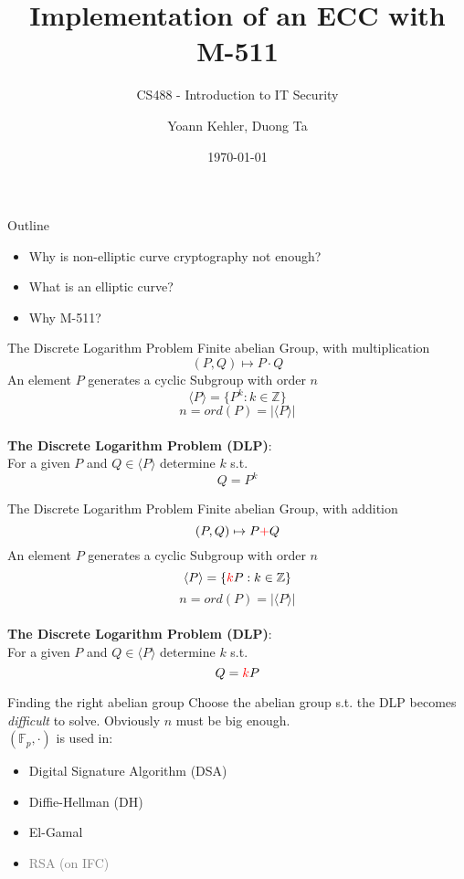 \documentclass{beamer}
\begin{document}
\title{Implementation of an ECC with M-511} 
\subtitle{CS488 - Introduction to IT Security}
\author{Yoann Kehler, Duong Ta}
\date{\today} 

\begin{frame}
\titlepage
\end{frame} 

\begin{frame}{Outline}
\begin{itemize}
	\item Why is non-elliptic curve cryptography not enough?
	\item What is an elliptic curve?
	\item Why M-511?
\end{itemize}
\end{frame} 
\begin{frame}{The Discrete Logarithm Problem\cite{werner2013elliptische}}
	Finite abelian Group, with multiplication\\
	\[(P,Q) \mapsto P \cdot Q\]
	\pause
	An element $P$ generates a cyclic Subgroup with order $n$\\
	\[\langle P \rangle = \{P^k : k \in \mathbb{Z} \} \]
	\[n = ord(P) = |\langle P \rangle| \]\\ \vspace{0.5cm}
	\pause
	\textbf{The Discrete Logarithm Problem (DLP)}: \\
	For a given $P$ and $Q \in \langle P \rangle$ determine $k$ s.t. \\
	\[Q=P^k\]
\end{frame}
\begin{frame}{The Discrete Logarithm Problem\cite{werner2013elliptische}}
Finite abelian Group, with \textcolor[rgb]{1.00,0.00,0.00}{addition}\\
\[(P,Q) \mapsto P \textcolor[rgb]{1.00,0.00,0.00}{+} Q\]
An element $P$ generates a cyclic Subgroup with order $n$\\
\[\langle P \rangle = \{\textcolor[rgb]{1.00,0.00,0.00}{k}P : k \in \mathbb{Z} \} \]
\[n = ord(P) = |\langle P \rangle| \]\\ \vspace{0.5cm}
\textbf{The Discrete Logarithm Problem (DLP)}: \\
For a given $P$ and $Q \in \langle P \rangle$ determine $k$ s.t. \\
\[Q=\textcolor[rgb]{1.00,0.00,0.00}{k}P\]

\end{frame}
\begin{frame}{Finding the right abelian group}
Choose the abelian group s.t. the DLP becomes \textit{difficult} to solve. Obviously $n$ must be big enough. \\
\vspace{2cm}
$(\mathbb{F}_p, \cdot)$ is used in:
\begin{itemize}
\item Digital Signature Algorithm (DSA)
\item Diffie-Hellman (DH)
\item El-Gamal
\item \textcolor{gray}{RSA (on IFC)}
\end{itemize}
\end{frame}
\end{document}
